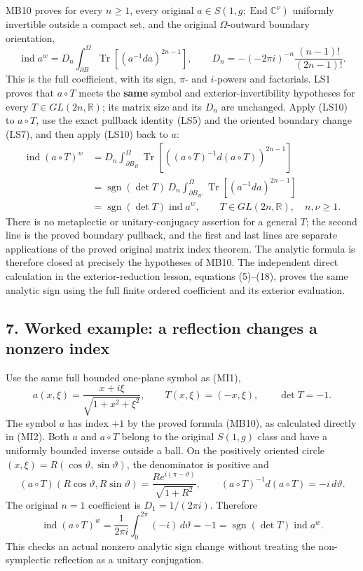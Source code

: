 \documentclass[
  11pt,
]{article}
\begin{document}
MB10 proves for every \(n\geq1\), every original
\(a\in S(1,g;\operatorname{End}\mathbb C^\nu)\) uniformly invertible
outside a compact set, and the original \(\Omega\)-outward boundary
orientation, \[
 \operatorname{ind}a^w
 =D_n\int_{\partial B}^{\Omega}
       \operatorname{Tr}[(a^{-1}da)^{2n-1}],
 \qquad
 D_n=-(-2\pi i)^{-n}
                 \frac{(n-1)!}{(2n-1)!}.
 \tag{LS10}
\] This is the full coefficient, with its sign, \(\pi\)- and
\(i\)-powers and factorials. LS1 proves that \(a\circ T\) meets the
\textbf{same} symbol and exterior-invertibility hypotheses for every
\(T\in GL(2n,\mathbb R)\); its matrix size and its \(D_n\) are
unchanged. Apply (LS10) to \(a\circ T\), use the exact pullback identity
(LS5) and the oriented boundary change (LS7), and then apply (LS10) back
to \(a\): \[
\begin{aligned}
 \operatorname{ind}(a\circ T)^w
 &=D_n\int_{\partial B_R}^{\Omega}
       \operatorname{Tr}
       [((a\circ T)^{-1}d(a\circ T))^{2n-1}]\\
 &=\operatorname{sgn}(\det T)\,D_n
       \int_{\partial B_{R'}}^{\Omega}
          \operatorname{Tr}[(a^{-1}da)^{2n-1}]\\
 &=\operatorname{sgn}(\det T)\operatorname{ind}a^w,
 \qquad T\in GL(2n,\mathbb R),\quad n,\nu\geq1.
\end{aligned}
\tag{LS11}
\] There is no metaplectic or unitary-conjugacy assertion for a general
\(T\); the second line is the proved boundary pullback, and the first
and last lines are separate applications of the proved original matrix
index theorem. The analytic formula is therefore closed at precisely the
hypotheses of MB10. The independent direct calculation in the
exterior-reduction lesson, equations (5)--(18), proves the same analytic
sign using the full finite ordered coefficient and its exterior
evaluation.

\subsection{7. Worked example: a reflection changes a nonzero
index}\label{worked-example-a-reflection-changes-a-nonzero-index}

Use the same full bounded one-plane symbol as (MI1), \[
 a(x,\xi)=\frac{x+i\xi}{\sqrt{1+x^2+\xi^2}},
 \qquad
 T(x,\xi)=(-x,\xi),\qquad \det T=-1.
 \tag{LI1}
\] The symbol \(a\) has index \(+1\) by the proved formula (MB10), as
calculated directly in (MI2). Both \(a\) and \(a\circ T\) belong to the
original \(S(1,g)\) class and have a uniformly bounded inverse outside a
ball. On the positively oriented circle
\((x,\xi)=R(\cos\vartheta,\sin\vartheta)\), the denominator is positive
and \[
 (a\circ T)(R\cos\vartheta,R\sin\vartheta)
   =\frac{R e^{i(\pi-\vartheta)}}{\sqrt{1+R^2}},
 \qquad
 (a\circ T)^{-1}d(a\circ T)=-i\,d\vartheta.
 \tag{LI2}
\] The original \(n=1\) coefficient is \(D_1=1/(2\pi i)\). Therefore \[
 \operatorname{ind}(a\circ T)^w
 =\frac1{2\pi i}\int_0^{2\pi}(-i)\,d\vartheta
 =-1
 =\operatorname{sgn}(\det T)\operatorname{ind}a^w.
 \tag{LI3}
\] This checks an actual nonzero analytic sign change without treating
the non-symplectic reflection as a unitary conjugation.
\end{document}
